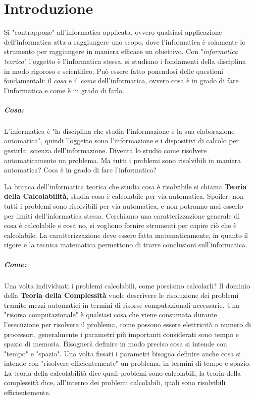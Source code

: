 
\chapter*{Introduzione}

Si "contrappone" all'informatica applicata, ovvero qualsiasi applicazione dell'informatica atta a raggiungere uno scopo, dove l'informatica è solamente lo strumento per raggiungere in maniera efficace un obiettivo. Con "\textit{informatica teorica}" l'oggetto è l'informatica stessa, si studiano i fondamenti della disciplina in modo rigoroso e scientifico. Può essere fatto ponendosi delle questioni fondamentali: il \textit{cosa} e il \textit{come} dell'informatica, ovvero cosa è in grado di fare l'informatica e come è in grado di farlo.

\paragraph{Cosa:} L'informatica è "la disciplina che studia l'informazione e la sua elaborazione automatica", quindi l'oggetto sono l'informazione e i dispositivi di calcolo per gestirla; scienza dell'informazione. Diventa lo studio come risolvere automaticamente un problema. Ma tutti i problemi sono risolvibili in maniera automatica? Cosa è in grado di fare l'informatica?

La branca dell'informatica teorica che studia cosa è risolvibile si chiama \textbf{Teoria della Calcolabilità}, studia cosa è calcolabile per via automatica. Spoiler: non tutti i problemi sono risolvibili per via automatica, e non potranno mai esserlo per limiti dell'informatica stessa. Cerchiamo una caratterizzazione generale di cosa è calcolabile e cosa no, si vogliono fornire strumenti per capire ciò che è calcolabile. La caratterizzazione deve essere fatta matematicamente, in quanto il rigore e la tecnica matematica permettono di trarre conclusioni sull'informatica.

\paragraph{Come:} Una volta individuati i problemi calcolabili, come possiamo calcolarli? Il dominio della \textbf{Teoria della Complessità} vuole descrivere le risoluzione dei problemi tramite mezzi automatici in termini di risorse computazionali necessarie. Una "risorsa computazionale" è qualsiasi cosa che viene consumata durante l'esecuzione per risolvere il problema, come possono essere elettricità o numero di processori, generalmente i parametri più importanti considerati sono tempo e spazio di memoria. Bisognerà definire in modo preciso cosa si intende con "tempo" e "spazio". Una volta fissati i parametri bisogna definire anche cosa si intende con "risolvere efficientemente" un problema, in termini di tempo e spazio. La teoria della calcolabilità dice quali problemi sono calcolabili, la teoria della complessità dice, all'interno dei problemi calcolabili, quali sono risolvibili efficientemente.

